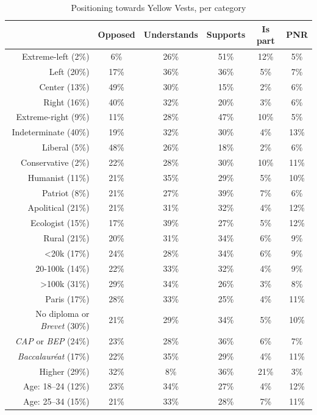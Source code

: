 \documentclass[english,5p,authoryear]{elsarticle}
\begin{document}
\begin{appendices}
\begin{spacing}{1}
\begin{table}[ht]
\centering
\caption{Positioning towards Yellow Vests, per category}
{\fontsize{9}{14}\selectfont
\begin{tabular}{rccccc}
  \hline \hline
 & Opposed & Understands & Supports & Is part & PNR \\ 
  \hline
  Extreme-left (2\%) & 6\% & 26\% & 51\% & 12\% & 5\% \\ 
  Left (20\%) & 17\% & 36\% & 36\% & 5\% & 7\% \\ 
  Center (13\%) & 49\% & 30\% & 15\% & 2\% & 6\% \\ 
  Right (16\%) & 40\% & 32\% & 20\% & 3\% & 6\% \\ 
  Extreme-right (9\%) & 11\% & 28\% & 47\% & 10\% & 5\% \\
  Indeterminate (40\%) & 19\% & 32\% & 30\% & 4\% & 13\% \\
  \hline
  Liberal (5\%) & 48\% & 26\% & 18\% & 2\% & 6\% \\
  Conservative (2\%) & 22\% & 28\% & 30\% & 10\% & 11\% \\
  Humanist (11\%) & 21\% & 35\% & 29\% & 5\% & 10\% \\
  Patriot (8\%) & 21\% & 27\% & 39\% & 7\% & 6\% \\
  Apolitical (21\%) & 21\% & 31\% & 32\% & 4\% & 12\% \\
  Ecologist (15\%) & 17\% & 39\% & 27\% & 5\% & 12\% \\
  \hline
  Rural (21\%) & 20\% & 31\% & 34\% & 6\% & 9\% \\ 
  <20k (17\%) & 24\% & 28\% & 34\% & 6\% & 9\% \\ 
  20-100k (14\%) & 22\% & 33\% & 32\% & 4\% & 9\% \\ 
  >100k (31\%) & 29\% & 34\% & 26\% & 3\% & 8\% \\ 
  Paris (17\%) & 28\% & 33\% & 25\% & 4\% & 11\% \\
  \hline
  No diploma or \textit{Brevet} (30\%) & 21\% & 29\% & 34\% & 5\% & 10\% \\ 
  \textit{CAP} or \textit{BEP} (24\%) & 23\% & 28\% & 36\% & 6\% & 7\% \\ 
  \textit{Baccalauréat} (17\%) & 22\% & 35\% & 29\% & 4\% & 11\% \\ 
  Higher (29\%) & 32\% & 8\% & 36\% & 21\% & 3\% \\
  \hline
  Age: 18--24 (12\%) & 23\% & 34\% & 27\% & 4\% & 12\% \\ 
  Age: 25--34 (15\%) & 21\% & 33\% & 28\% & 7\% & 11\% \\ 

\end{tabular}}
\end{table}
\end{spacing}
\end{appendices}
\end{document}
